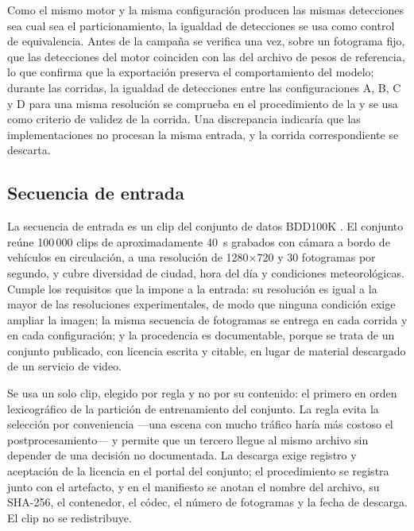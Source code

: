 Como el mismo motor y la misma configuración producen las mismas detecciones
sea cual sea el particionamiento, la igualdad de detecciones se usa como
control de equivalencia. Antes de la campaña se verifica una vez, sobre un
fotograma fijo, que las detecciones del motor coinciden con las del archivo
de pesos de referencia, lo que confirma que la exportación preserva el
comportamiento del modelo; durante las corridas, la igualdad de detecciones
entre las configuraciones A, B, C y D para una misma resolución se comprueba
en el procedimiento de la  y se usa como criterio de
validez de la corrida. Una discrepancia indicaría que las implementaciones no
procesan la misma entrada, y la corrida correspondiente se descarta.

\subsection{Secuencia de entrada}
\label{sec:input-sequence}

La secuencia de entrada es un clip del conjunto de datos BDD100K
\cite{yu2020}. El conjunto reúne 100\,000 clips de aproximadamente 40~s
grabados con cámara a bordo de vehículos en circulación, a una resolución de
1280$\times$720 y 30 fotogramas por segundo, y cubre diversidad de ciudad,
hora del día y condiciones meteorológicas. Cumple los requisitos que la
 impone a la entrada: su resolución es igual a la mayor de
las resoluciones experimentales, de modo que ninguna condición exige ampliar
la imagen; la misma secuencia de fotogramas se entrega en cada corrida y en
cada configuración; y la procedencia es documentable, porque se trata de un
conjunto publicado, con licencia escrita y citable, en lugar de material
descargado de un servicio de video.

Se usa un solo clip, elegido por regla y no por su contenido: el primero en
orden lexicográfico de la partición de entrenamiento del conjunto. La regla
evita la selección por conveniencia —una escena con mucho tráfico haría más
costoso el postprocesamiento— y permite que un tercero llegue al mismo
archivo sin depender de una decisión no documentada. La descarga exige
registro y aceptación de la licencia en el portal del conjunto; el
procedimiento se registra junto con el artefacto, y en el manifiesto se
anotan el nombre del archivo, su SHA-256, el contenedor, el códec, el número
de fotogramas y la fecha de descarga. El clip no se redistribuye.


